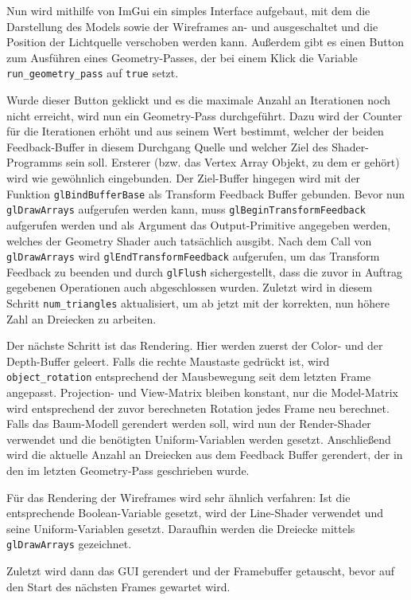 Nun wird mithilfe von ImGui ein simples Interface aufgebaut, mit dem die Darstellung des Models sowie der Wireframes an- und ausgeschaltet und die Position der Lichtquelle verschoben werden kann. Außerdem gibt es einen Button zum Ausführen eines Geometry-Passes, der bei einem Klick die Variable \lstinline{run_geometry_pass} auf \lstinline{true} setzt.

Wurde dieser Button geklickt und es die maximale Anzahl an Iterationen noch nicht erreicht, wird nun ein Geometry-Pass durchgeführt. Dazu wird der Counter für die Iterationen erhöht und aus seinem Wert bestimmt, welcher der beiden Feedback-Buffer in diesem Durchgang Quelle und welcher Ziel des Shader-Programms sein soll. Ersterer (bzw. das Vertex Array Objekt, zu dem er gehört) wird wie gewöhnlich eingebunden. Der Ziel-Buffer hingegen wird mit der Funktion \lstinline{glBindBufferBase} als Transform Feedback Buffer gebunden. Bevor nun \lstinline{glDrawArrays} aufgerufen werden kann, muss \lstinline{glBeginTransformFeedback} aufgerufen werden und als Argument das Output-Primitive angegeben werden, welches der Geometry Shader auch tatsächlich ausgibt. Nach dem Call von \lstinline{glDrawArrays} wird \lstinline{glEndTransformFeedback} aufgerufen, um das Transform Feedback zu beenden und durch \lstinline{glFlush} sichergestellt, dass die zuvor in Auftrag gegebenen Operationen auch abgeschlossen wurden. Zuletzt wird in diesem Schritt \lstinline{num_triangles} aktualisiert, um ab jetzt mit der korrekten, nun höhere Zahl an Dreiecken zu arbeiten. 

Der nächste Schritt ist das Rendering. Hier werden zuerst der Color- und der Depth-Buffer geleert. Falls die rechte Maustaste gedrückt ist, wird \lstinline{object_rotation} entsprechend der Mausbewegung seit dem letzten Frame angepasst. Projection- und View-Matrix bleiben konstant, nur die Model-Matrix wird entsprechend der zuvor berechneten Rotation jedes Frame neu berechnet. Falls das Baum-Modell gerendert werden soll, wird nun der Render-Shader verwendet und die benötigten Uniform-Variablen werden gesetzt. Anschließend wird die aktuelle Anzahl an Dreiecken aus dem Feedback Buffer gerendert, der in den im letzten Geometry-Pass geschrieben wurde. 

Für das Rendering der Wireframes wird sehr ähnlich verfahren: Ist die entsprechende Boolean-Variable gesetzt, wird der Line-Shader verwendet und seine Uniform-Variablen gesetzt. Daraufhin werden die Dreiecke mittels \lstinline{glDrawArrays} gezeichnet.

Zuletzt wird dann das GUI gerendert und der Framebuffer getauscht, bevor auf den Start des nächsten Frames gewartet wird.



